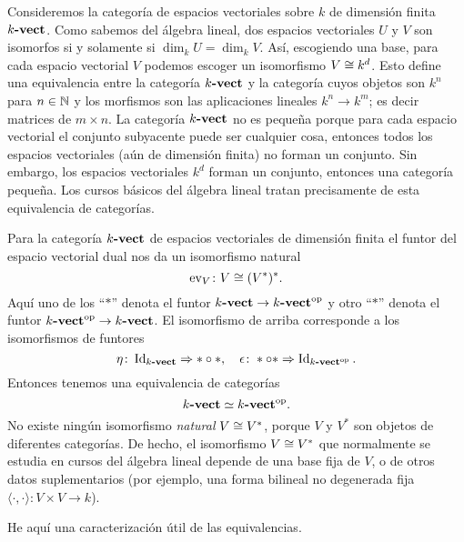 \documentclass{article}
\numberwithin{equation}{section}
\theoremstyle{definition}
\begin{document}
\begin{ejemplo}
  Consideremos la categoría de espacios vectoriales sobre $k$ de dimensión
  finita $k\text{\bf -vect}$. Como sabemos del álgebra lineal, dos espacios
  vectoriales $U$ y $V$ son isomorfos si y solamente si
  $\dim_k U = \dim_k V$. Así, escogiendo una base, para cada espacio vectorial
  $V$ podemos escoger un isomorfismo $V \cong k^d$. Esto define una equivalencia
  entre la categoría $k\text{\bf -vect}$ y la categoría cuyos objetos son $k^n$
  para $n\in \mathbb{N}$ y los morfismos son las aplicaciones lineales $k^n\to k^m$;
  es decir matrices de $m\times n$. La categoría $k\text{\bf -vect}$ no es pequeña
  porque para cada espacio vectorial el conjunto subyacente puede ser cualquier
  cosa, entonces todos los espacios vectoriales (aún de dimensión finita) no
  forman un conjunto. Sin embargo, los espacios vectoriales $k^d$ forman
  un conjunto, entonces una categoría pequeña. Los cursos básicos del álgebra
  lineal tratan precisamente de esta equivalencia de categorías.
\end{ejemplo}

\begin{ejemplo}
  Para la categoría $k\text{\bf -vect}$ de espacios vectoriales de dimensión finita
  el funtor del espacio vectorial dual nos da un isomorfismo natural
  $$\operatorname{ev}_V\colon V \cong (V^*)^*.$$
  Aquí uno de los ``$*$'' denota el funtor
  $k\text{\bf -vect} \to k\text{\bf -vect}^\mathrm{op}$ y otro ``$*$'' denota el
  funtor $k\text{\bf -vect}^\mathrm{op} \to k\text{\bf -vect}$. El isomorfismo de
  arriba corresponde a los isomorfismos de funtores
  \[ \eta\colon \operatorname{Id}_{k\text{\bf -vect}} \Rightarrow *\circ *, \quad
     \epsilon\colon *\circ* \Rightarrow \operatorname{Id}_{k\text{\bf -vect}^\mathrm{op}}. \]
  Entonces tenemos una equivalencia de categorías
  $$k\text{\bf -vect} \simeq k\text{\bf -vect}^\mathrm{op}.$$
  No existe ningún isomorfismo \emph{natural} $V \cong V^*$, porque $V$ y $V^*$
  son objetos de diferentes categorías. De hecho, el isomorfismo $V \cong V^*$
  que normalmente se estudia en cursos del álgebra lineal depende de una base
  fija de $V$, o de otros datos suplementarios (por ejemplo, una forma bilineal
  no degenerada fija $\langle\cdot,\cdot\rangle\colon V\times V \to k$).
\end{ejemplo}

He aquí una caracterización útil de las equivalencias.
\end{document}
